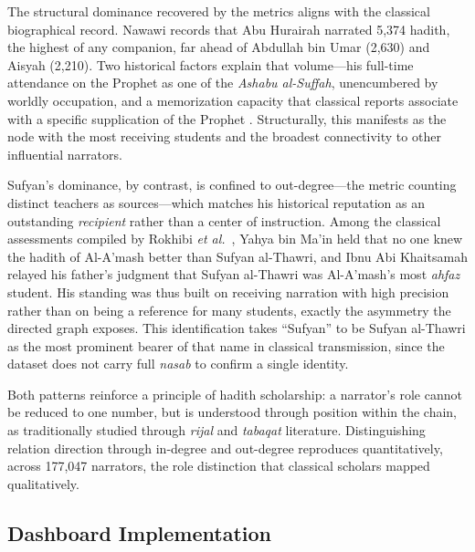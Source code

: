 \documentclass[conference]{IEEEtran}
\begin{document}
The structural dominance recovered by the metrics aligns with the classical
biographical record. Nawawi \cite{Nawawi2024} records that Abu Hurairah narrated
5{,}374 hadith, the highest of any companion, far ahead of Abdullah bin Umar
(2{,}630) and Aisyah (2{,}210). Two historical factors explain that volume---his
full-time attendance on the Prophet as one of the \textit{Ashabu al-Suffah},
unencumbered by worldly occupation, and a memorization capacity that classical
reports associate with a specific supplication of the Prophet \cite{Nawawi2024}.
Structurally, this manifests as the node with the most receiving students and the
broadest connectivity to other influential narrators.

Sufyan's dominance, by contrast, is confined to out-degree---the metric counting
distinct teachers as sources---which matches his historical reputation as an
outstanding \emph{recipient} rather than a center of instruction. Among the
classical assessments compiled by Rokhibi \textit{et al.}\ \cite{Rokhibi2025},
Yahya bin Ma'in held that no one knew the hadith of Al-A'mash better than Sufyan
al-Thawri, and Ibnu Abi Khaitsamah relayed his father's judgment that Sufyan
al-Thawri was Al-A'mash's most \textit{ahfaz} student. His standing was thus built
on receiving narration with high precision rather than on being a reference for
many students, exactly the asymmetry the directed graph exposes. This
identification takes ``Sufyan'' to be Sufyan al-Thawri as the most prominent
bearer of that name in classical transmission, since the dataset does not carry
full \textit{nasab} to confirm a single identity.

Both patterns reinforce a principle of hadith scholarship: a narrator's role
cannot be reduced to one number, but is understood through position within the
chain, as traditionally studied through \textit{rijal} and \textit{tabaqat}
literature. Distinguishing relation direction through in-degree and out-degree
reproduces quantitatively, across 177{,}047 narrators, the role distinction that
classical scholars mapped qualitatively.

\subsection{Dashboard Implementation}
\end{document}
